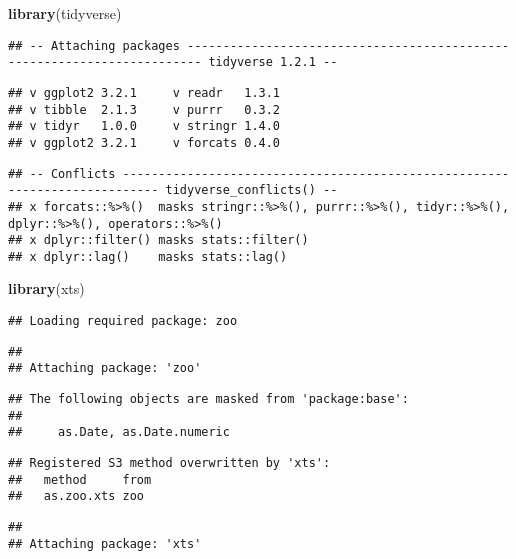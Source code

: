 \documentclass[]{article}
\newenvironment{Shaded}{\begin{snugshade}}{\end{snugshade}}
\newcommand{\KeywordTok}[1]{\textcolor[rgb]{0.13,0.29,0.53}{\textbf{#1}}}
\newcommand{\NormalTok}[1]{#1}
\begin{document}
\begin{Shaded}
\begin{Highlighting}[]
\KeywordTok{library}\NormalTok{(tidyverse)}
\end{Highlighting}
\end{Shaded}

\begin{verbatim}
## -- Attaching packages ------------------------------------------------------------------------ tidyverse 1.2.1 --
\end{verbatim}

\begin{verbatim}
## v ggplot2 3.2.1     v readr   1.3.1
## v tibble  2.1.3     v purrr   0.3.2
## v tidyr   1.0.0     v stringr 1.4.0
## v ggplot2 3.2.1     v forcats 0.4.0
\end{verbatim}

\begin{verbatim}
## -- Conflicts --------------------------------------------------------------------------- tidyverse_conflicts() --
## x forcats::%>%()  masks stringr::%>%(), purrr::%>%(), tidyr::%>%(), dplyr::%>%(), operators::%>%()
## x dplyr::filter() masks stats::filter()
## x dplyr::lag()    masks stats::lag()
\end{verbatim}

\begin{Shaded}
\begin{Highlighting}[]
\KeywordTok{library}\NormalTok{(xts)}
\end{Highlighting}
\end{Shaded}

\begin{verbatim}
## Loading required package: zoo
\end{verbatim}

\begin{verbatim}
## 
## Attaching package: 'zoo'
\end{verbatim}

\begin{verbatim}
## The following objects are masked from 'package:base':
## 
##     as.Date, as.Date.numeric
\end{verbatim}

\begin{verbatim}
## Registered S3 method overwritten by 'xts':
##   method     from
##   as.zoo.xts zoo
\end{verbatim}

\begin{verbatim}
## 
## Attaching package: 'xts'
\end{verbatim}
\end{document}
